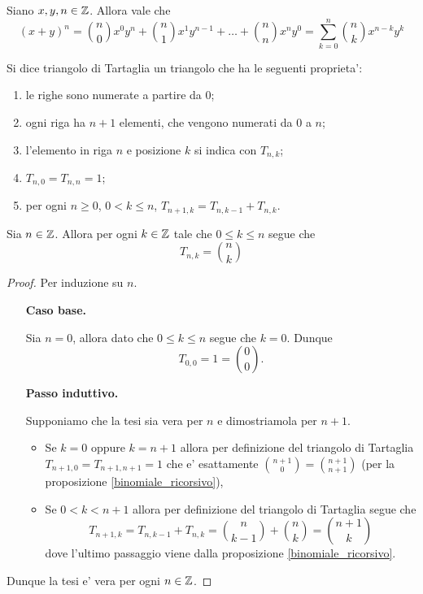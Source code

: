 \begin{theorem} \label{binomiale}
    Siano $x, y, n \in \mathbb{Z}$. Allora vale che
    \begin{equation}
        (x+y)^n = \binom{n}{0}x^0y^n + \binom{n}{1}x^1y^{n-1} + \dots + \binom{n}{n}x^ny^0 = \sum_{k=0}^n \binom{n}{k}x^{n-k}y^k
    \end{equation}
\end{theorem}

\begin{definition}
    Si dice triangolo di Tartaglia un triangolo che ha le seguenti proprieta':
    \begin{enumerate}
        \item le righe sono numerate a partire da $0$;
        \item ogni riga ha $n + 1$ elementi, che vengono numerati da $0$ a $n$;
        \item l'elemento in riga $n$ e posizione $k$ si indica con $T_{n, k}$;
        \item $T_{n, 0} = T_{n, n} = 1$;
        \item per ogni $n \geq 0$, $0 < k \leq n$, $T_{n + 1, k} = T_{n, k - 1} + T_{n, k}$.
    \end{enumerate}
\end{definition}


\begin{proposition}
    Sia $n \in \mathbb{Z}$. Allora per ogni $k \in \mathbb{Z}$ tale che $0 \leq k \leq n$ segue che \begin{equation}
        T_{n,k} = \binom{n}{k}
    \end{equation}
\end{proposition}
\begin{proof}
    Per induzione su $n$.
    \begin{itemize}
        \item[\textbf{Caso base.}]

        Sia $n = 0$, allora dato che $0 \leq k \leq n$ segue che $k = 0$. Dunque
        \[
            T_{0, 0} = 1 = \binom{0}{0}.    
        \]
        \item[\textbf{Passo induttivo.}]
        
        Supponiamo che la tesi sia vera per $n$ e dimostriamola per $n+1$. 
        \begin{itemize}
            \item Se $k = 0$ oppure $k = n + 1$ allora per definizione del triangolo di Tartaglia $T_{n+1, 0} = T_{n+1, n+1} = 1$ che e' esattamente $\binom{n+1}{0} = \binom{n+1}{n+1}$ (per la proposizione \ref{binomiale_ricorsivo}),
            \item Se $0 < k < n+1$ allora per definizione del triangolo di Tartaglia segue che \[
                T_{n+1, k} = T_{n, k-1} + T_{n, k} = \binom{n}{k-1} + \binom{n}{k} = \binom{n+1}{k}    
            \] dove l'ultimo passaggio viene dalla proposizione \ref{binomiale_ricorsivo}.
        \end{itemize}
    \end{itemize}
    Dunque la tesi e' vera per ogni $n \in \mathbb{Z}$.
\end{proof}

